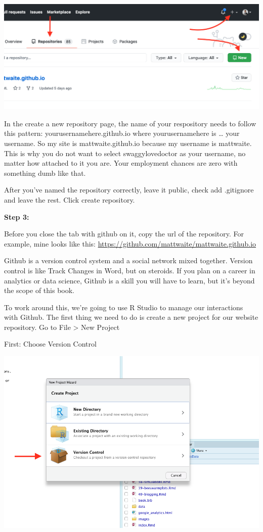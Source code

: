 \documentclass[
]{book}
\begin{document}
\includegraphics[width=16.54in]{images/blog7}

In the create a new repository page, the name of your respository needs to follow this pattern: yourusernamehere.github.io where yourusernamehere is \ldots{} your username. So my site is mattwaite.github.io because my username is mattwaite. This is why you do not want to select swaggylovedoctor as your username, no matter how attached to it you are. Your employment chances are zero with something dumb like that.

After you've named the repository correctly, leave it public, check add .gitignore and leave the rest. Click create repository.

\textbf{Step 3:}

Before you close the tab with github on it, copy the url of the repository. For example, mine looks like this: \url{https://github.com/mattwaite/mattwaite.github.io}

Github is a version control system and a social network mixed together. Version control is like Track Changes in Word, but on steroids. If you plan on a career in analytics or data science, Github is a skill you will have to learn, but it's beyond the scope of this book.

To work around this, we're going to use R Studio to manage our interactions with Github. The first thing we need to do is create a new project for our website repository. Go to File \textgreater{} New Project

First: Choose Version Control

\includegraphics[width=13.17in]{images/blog9}
\end{document}
